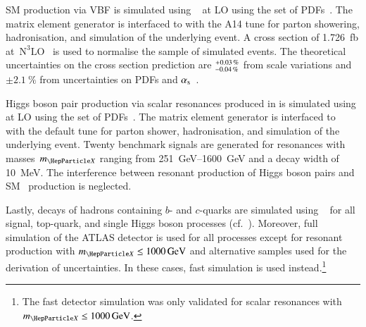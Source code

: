 SM \HH production via VBF is simulated using
\MGNLO~\cite{Alwall:2014hca} %
at LO %
using the \NNPDF[3.0nlo] set of PDFs~\cite{Ball:2014uwa}. The matrix element
generator is interfaced to \PYTHIA[8] with the A14 tune for parton showering,
hadronisation, and simulation of the underlying event. A cross section of
\SI{1.726}{\femto\barn} at~$\text{N}^3\text{LO}$~\cite{Dreyer:2018qbw,LHCHWGHH}
is used to normalise the sample of simulated events. The theoretical
uncertainties on the cross section prediction are
$^{\hspace{0.25pt}+\hspace{0.25pt}0.03\,\%}_{-0.04\,\%}$ from scale variations
and $\pm\SI{2.1}{\percent}$ from uncertainties on PDFs and
$\alpha_{\text{s}}$~\cite{LHCHWGHH}.

Higgs boson pair production via scalar resonances produced in \ggF is simulated
using \MGNLO at LO using the \NNPDF[2.3lo] set of PDFs~\cite{Ball:2012cx}. The
matrix element generator is interfaced to
\HERWIG[7.1]~\cite{Gieseke:2012ft,Bellm:2017jjp} with the default tune for
parton shower, hadronisation, and simulation of the underlying event. Twenty
benchmark signals are generated for resonances with masses~$\mX$ ranging from
\SIrange{251}{1600}{\GeV} and a decay width of \SI{10}{\MeV}.
The interference between resonant production of Higgs boson pairs and SM~\HH
production is neglected.

Lastly, decays of hadrons containing $b$- and $c$-quarks are simulated using
\EVTGEN~\cite{Lange:2001uf} for all signal, top-quark, and single Higgs boson
processes (cf.~). Moreover, full simulation of the ATLAS
detector is used for all processes except for resonant \HH production with
$\mX \leq \SI{1000}{\GeV}$ and alternative samples used for the derivation of
uncertainties. In these cases, fast simulation is used instead.\footnote{The
  fast detector simulation was only validated for scalar resonances with
  $\mX \leq \SI{1000}{\GeV}$.}

